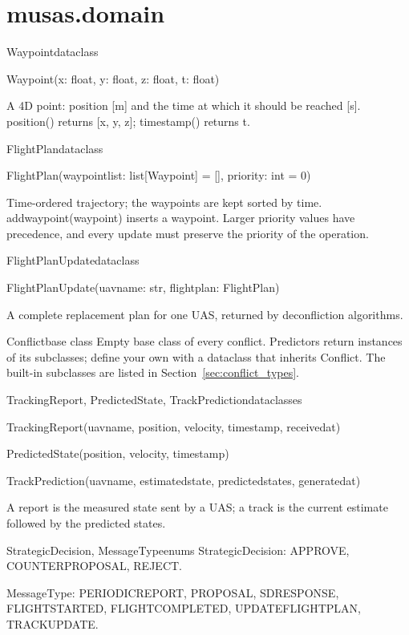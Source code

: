 \documentclass[11pt,a4paper,oneside]{report}
\newcommand{\sig}[1]{\par{\small\ttfamily\def\_{\textunderscore\allowbreak}\color{primary!85!black}#1}\par}
\newcommand{\code}[1]{\textcolor{primary!85!black}{\ttfamily\def\_{\textunderscore\allowbreak}#1}}
\newcommand{\pkg}[1]{\textcolor{accent!85!black}{\ttfamily #1}}
\begin{document}
\section{\texorpdfstring{\pkg{musas.domain}}{musas.domain}}

\begin{api}{Waypoint}{dataclass}
\sig{Waypoint(x: float, y: float, z: float, t: float)}
A 4D point: position [m] and the time at which it should be reached [s].
\code{position()} returns \code{[x, y, z]}; \code{timestamp()} returns
\code{t}.
\end{api}

\begin{api}{FlightPlan}{dataclass}
\sig{FlightPlan(waypoint\_list: list[Waypoint] = [], priority: int = 0)}
Time-ordered trajectory; the waypoints are kept sorted by time.
\code{add\_waypoint(waypoint)} inserts a waypoint. Larger \code{priority}
values have precedence, and every update must preserve the priority of the
operation.
\end{api}

\begin{api}{FlightPlanUpdate}{dataclass}
\sig{FlightPlanUpdate(uav\_name: str, flight\_plan: FlightPlan)}
A complete replacement plan for one UAS, returned by deconfliction
algorithms.
\end{api}

\begin{api}{Conflict}{base class}
Empty base class of every conflict. Predictors return instances of its
subclasses; define your own with a dataclass that inherits \code{Conflict}.
The built-in subclasses are listed in Section~\ref{sec:conflict_types}.
\end{api}

\begin{api}{TrackingReport, PredictedState, TrackPrediction}{dataclasses}
\sig{TrackingReport(uav\_name, position, velocity, timestamp, received\_at)}
\sig{PredictedState(position, velocity, timestamp)}
\sig{TrackPrediction(uav\_name, estimated\_state, predicted\_states,
generated\_at)}
A report is the measured state sent by a UAS; a track is the current
estimate followed by the predicted states.
\end{api}

\begin{api}{StrategicDecision, MessageType}{enums}
\code{StrategicDecision}: \code{APPROVE}, \code{COUNTER\_PROPOSAL},
\code{REJECT}.\par
\code{MessageType}: \code{PERIODIC\_REPORT}, \code{PROPOSAL},
\code{SD\_RESPONSE}, \code{FLIGHT\_STARTED}, \code{FLIGHT\_COMPLETED},
\code{UPDATE\_FLIGHT\_PLAN}, \code{TRACK\_UPDATE}.
\end{api}
\end{document}
